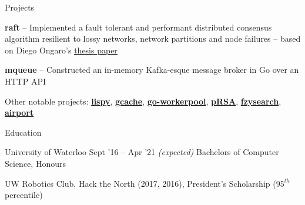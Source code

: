 \documentclass{resume} %
\begin{document}
\begin{rSection}{Projects}
  
  \begin{rProjectSection}
    \item \textbf {raft} -- Implemented a fault tolerant and performant distributed
      consensus algorithm resilient to lossy networks, network partitions and
      node failures -- based on Diego Ongaro's
      \href{https://raft.github.io/raft.pdf}{\underline{thesis paper}}
    \item \textbf {mqueue} -- Constructed an in-memory Kafka-esque message broker in Go 
      over an HTTP API
  \end{rProjectSection}

  \begin{rBlurbSection}
    \item {Other notable projects:}
      \href{https://github.com/ridwanmsharif/lispy}{\textbf{lispy}},
      \href{https://github.com/ridwanmsharif/cache}{\textbf{gcache}},
      \href{https://github.com/ridwanmsharif/goworkerpool}{\textbf{go-workerpool}},
      \href{https://github.com/ridwanmsharif/prsa}{\textbf{pRSA}},
      \href{https://github.com/ridwanmsharif/fzysearch}{\textbf{fzysearch}},
      \href{https://github.com/ridwanmsharif/airport}{\textbf{airport}}
  \end{rBlurbSection} 
 
\end{rSection}


\begin{rSection}{Education}
  \begin{rSubsection}{University of Waterloo}
		     {Sept '16 -- Apr '21 \em (expected)}
		     {Bachelors of Computer Science, Honours}
		     {}
    \item UW Robotics Club, Hack the North (2017, 2016), President's Scholarship
      ($95^{th}$ percentile)
  \end{rSubsection}
\end{rSection} 
\end{document}
